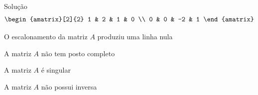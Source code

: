 \begin{resolution}{Solução}
  \[
    \begin{amatrix}[2]{2}
      1 & 2 & 1 & 0 \\
      0 & 0 & -2 & 1
    \end{amatrix}
  \]

  \pause
  O escalonamento da matriz $A$ produziu uma linha nula

  \pause
  A matriz $A$ não tem posto completo

  \pause
  A matriz $A$ é singular

  \pause
  A matriz $A$ não possui inversa
\end{resolution}

\endinput
